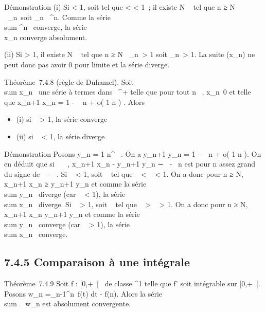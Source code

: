 \documentclass[]{article}
\begin{document}
Démonstration (i) Si \ell < 1, soit \rho tel que \ell < \rho
< 1~; il existe N \in {}~ tel que n ≥ N
\rigtharrow~\rootn\of\x_n\
\leq \rho soit
\x_n\ \leq
\rho^n. Comme la série
\\sum  \rho^n~
converge, la série \\\sum
 x_n converge absolument.

(ii) Si \ell > 1, il existe N \in {}~ tel que n ≥ N
\rigtharrow~\rootn\of\x_n\
> 1 soit
\x_n\
> 1. La suite (x_n) ne peut donc pas avoir 0 pour
limite et la série diverge.

Théorème~7.4.8 (règle de Duhamel). Soit
\\sum  x_n~ une
série à termes dans ~^+ telle que pour tout n \in {}~,
x_n\neq~0 et telle que  x_n+1
\over x_n = 1 - \lambda~ \over n +
o( 1 \over n ) . Alors

\begin{itemize}
\itemsep1pt\parskip0pt
\item
  (i) si \lambda~ > 1, la série converge
\item
  (ii) si \lambda~ < 1, la série diverge
\end{itemize}

Démonstration Posons y_n = 1 \over
n^\alpha~ . On a  y_n+1 \over
y_n = 1 - \alpha~ \over n + o( 1
\over n ). On en déduit que si
\alpha~\neq~\lambda~,  x_n+1 \over
x_n - y_n+1 \over y_n
∼ \alpha~-\lambda~ \over n est pour n assez grand du signe de \alpha~ -
\lambda~. Si \lambda~ < 1, soit \alpha~ tel que \lambda~ < \alpha~ < 1. On
a donc pour n ≥ N,  x_n+1 \over x_n
≥ y_n+1 \over y_n et comme la série
\\sum  y_n~
diverge (car \alpha~ < 1), la série
\\sum  x_n~
diverge. Si \lambda~ > 1, soit \alpha~ tel que \lambda~ > \alpha~
> 1. On a donc pour n ≥ N,  x_n+1
\over x_n \leq y_n+1
\over y_n et comme la série
\\sum  y_n~
converge (car \alpha~ > 1), la série
\\sum  x_n~
converge.

\subsection{7.4.5 Comparaison à une intégrale}

Théorème~7.4.9 Soit f : [0,+\infty~[\rightarrow~  de classe ^1 telle que
f' soit intégrable sur [0,+\infty~[. Posons w_n
=\int  _n-1^n~f(t) dt - f(n).
Alors la série \\sum ~
w_n est absolument convergente.
\end{document}
